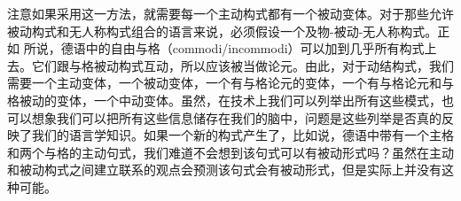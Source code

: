 注意如果采用这一方法，就需要每一个主动构式都有一个被动变体。对于那些允许被动构式和无人称构式组合的语言来说，必须假设一个及物-被动-无人称构式。正如 所说，德语中的自由与格（commodi/incommodi）可以加到几乎所有构式上去。它们跟与格被动构式互动，所以应该被当做论元。由此，对于动结构式，我们需要一个主动变体，一个被动变体，一个有与格论元的变体，一个有与格论元和与格被动的变体，一个中动变体。虽然，在技术上我们可以列举出所有这些模式，也可以想象我们可以把所有这些信息储存在我们的脑中，问题是这些列举是否真的反映了我们的语言学知识。如果一个新的构式产生了，比如说，德语中带有一个主格和两个与格的主动句式，我们难道不会想到该句式可以有被动形式吗？虽然在主动和被动构式之间建立联系的观点会预测该句式会有被动形式，但是实际上并没有这种可能。

